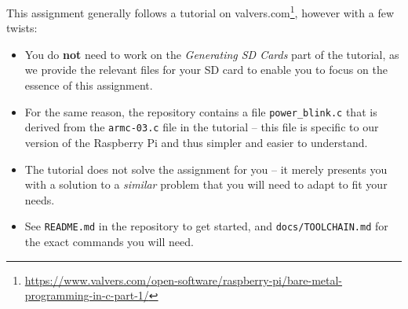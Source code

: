 \documentclass[12pt,a4paper,oneside,openany]{book}
\begin{document}
This assignment generally follows a tutorial on valvers.com\footnote{\url{https://www.valvers.com/open-software/raspberry-pi/bare-metal-programming-in-c-part-1/}}, however with a few twists:

\begin{itemize}
    \item You do \textbf{not} need to work on the \textit{Generating SD Cards} part of the tutorial, as we provide the relevant files for your SD card to enable you to focus on the essence of this assignment.
    \item For the same reason, the repository contains a file \texttt{power\_blink.c} that is derived from the \texttt{armc-03.c} file in the tutorial -- this file is specific to our version of the Raspberry Pi and thus simpler and easier to understand.
    \item The tutorial does not solve the assignment for you -- it merely presents you with a solution to a \textit{similar} problem that you will need to adapt to fit your needs.
    \item See \texttt{README.md} in the repository to get started, and \texttt{docs/TOOLCHAIN.md} for the exact commands you will need.
\end{itemize}

\newpage
\end{document}
